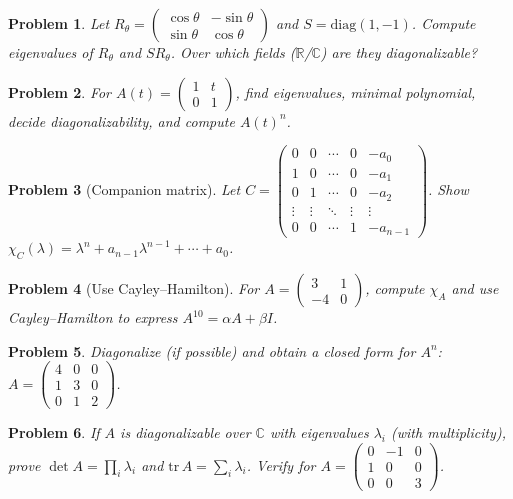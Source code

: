 \documentclass[11pt]{article}
\theoremstyle{upright}
\newtheorem{problem}{Problem}
\begin{document}
\begin{problem}
Let $R_\theta=\begin{pmatrix}\cos\theta&-\sin\theta\\ \sin\theta&\cos\theta\end{pmatrix}$ and $S=\mathrm{diag}(1,-1)$. 
Compute eigenvalues of $R_\theta$ and $SR_\theta$. Over which fields ($\mathbb{R}$/$\mathbb{C}$) are they diagonalizable?
\end{problem}

\begin{problem}
For $A(t)=\begin{pmatrix}1&t\\0&1\end{pmatrix}$, find eigenvalues, minimal polynomial, decide diagonalizability, and compute $A(t)^n$.
\end{problem}

\begin{problem}[Companion matrix]
Let
$C=\begin{pmatrix}
0&0&\cdots&0&-a_0\\
1&0&\cdots&0&-a_1\\
0&1&\cdots&0&-a_2\\
\vdots&\vdots&\ddots&\vdots&\vdots\\
0&0&\cdots&1&-a_{n-1}
\end{pmatrix}$.
Show $\chi_C(\lambda)=\lambda^n+a_{n-1}\lambda^{n-1}+\cdots+a_0$.
\end{problem}

\begin{problem}[Use Cayley--Hamilton]
For $A=\begin{pmatrix}3&1\\ -4&0\end{pmatrix}$, compute $\chi_A$ and use Cayley--Hamilton to express $A^{10}=\alpha A+\beta I$.
\end{problem}

\begin{problem}
Diagonalize (if possible) and obtain a closed form for $A^n$:
$A=\begin{pmatrix}4&0&0\\ 1&3&0\\ 0&1&2\end{pmatrix}$.
\end{problem}

\begin{problem}
If $A$ is diagonalizable over $\mathbb{C}$ with eigenvalues $\lambda_i$ (with multiplicity), prove $\det A=\prod_i\lambda_i$ and $\mathrm{tr}\,A=\sum_i\lambda_i$. Verify for $A=\begin{pmatrix}0&-1&0\\1&0&0\\0&0&3\end{pmatrix}$.
\end{problem}
\end{document}
